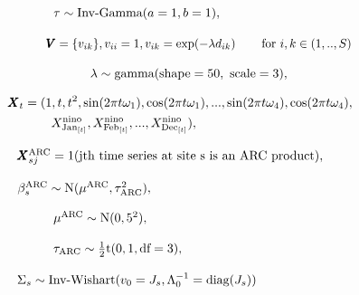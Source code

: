 \documentclass[12pt]{article}
\def\bX{\pmb{X}}
\def\bV{\pmb{V}}
\begin{document}
$\hspace{1.7in}
\tau \sim \text{Inv-Gamma}(a = 1, b = 1),
$

$\hspace{1.7in}
\bV=\{v_{ik}\}, v_{ii}=1, v_{ik} = \exp(-\lambda d_{ik}) \hspace{0.3in} \text{for $i,k \in (1,..,S)$}
$

$\hspace{2.1in}
\lambda \sim \text{gamma}(\text{shape} = 50, \text{ scale} = 3),
$


\vspace{-0.4in}
\begin{align*}
\hspace{1.2in}
\bX_t &= (1, t, t^2, \sin(2\pi t \omega_1), \cos(2\pi t \omega_1),..., \sin(2\pi t \omega_4), \cos(2\pi t \omega_4), \\
& \hspace{0.3in} X^\text{nino}_{\text{Jan}_{[t]}}, X^\text{nino}_{\text{Feb}_{[t]}}, ..., X^\text{nino}_{\text{Dec}_{[t]}}),
\end{align*}

\vspace{-0.2in}
$\hspace{1.3in}
\bX^\text{ARC}_{sj} = 1(\text{jth time series at site s is an ARC product}),
$

$\hspace{1.3in}
\beta^\text{ARC}_s \sim \text{N}(\mu^\text{ARC}, \tau^2_\text{ARC}),
$

$\hspace{1.7in}
\mu^\text{ARC} \sim \text{N}(0, 5^2),
$

$\hspace{1.7in}
\tau_\text{ARC} \sim \frac{1}{2}\text{t}(0, 1, \text{df} = 3),
$

$\hspace{1.3in}
\Sigma_s \sim \text{Inv-Wishart}(v_0 = J_s, \Lambda_0^{-1} = \text{diag}(J_s))
$
\end{document}
